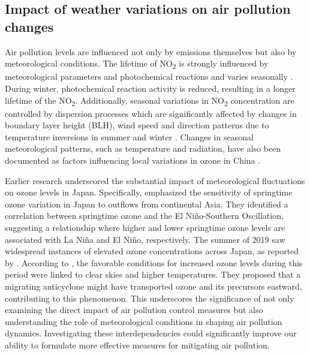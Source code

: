 \subsection{Impact of weather variations on air pollution changes}

Air pollution levels are influenced not only by emissions themselves but also by meteorological conditions. The lifetime of NO\textsubscript{2} is strongly influenced by meteorological parameters and photochemical reactions \citep{barre2021estimating} and varies seasonally \citep{dragomir2015modeling,kendrick2015diurnal}. During winter, photochemical reaction activity is reduced, resulting in a longer lifetime of the NO\textsubscript{2}. Additionally, seasonal variations in NO\textsubscript{2} concentration are controlled by dispersion processes which are significantly affected by changes in boundary layer height (BLH), wind speed and direction patterns due to temperature inversions in summer and winter \citep{barre2021estimating,kendrick2015diurnal}. Changes in seasonal meteorological patterns, such as temperature and radiation, have also been documented as factors influencing local variations in ozone in China \citep{yang2019study, yu2021review}. \par

Earlier research underscored the substantial impact of meteorological fluctuations on ozone levels in Japan. Specifically, \citep{kurokawa2009influence} emphasized the sensitivity of springtime ozone variation in Japan to outflows from continental Asia. They identified a correlation between springtime ozone and the El Niño-Southern Oscillation, suggesting a relationship where higher and lower springtime ozone levels are associated with La Niña and El Niño, respectively. The summer of 2019 saw widespread instances of elevated ozone concentrations across Japan, as reported by \citep{fukunaga2021relationship, ito202130}. According to \citep{fukunaga2021relationship}, the favorable conditions for increased ozone levels during this period were linked to clear skies and higher temperatures. They proposed that a migrating anticyclone might have transported ozone and its precursors eastward, contributing to this phenomenon. This underscores the significance of not only examining the direct impact of air pollution control measures but also understanding the role of meteorological conditions in shaping air pollution dynamics. Investigating these interdependencies could significantly improve our ability to formulate more effective measures for mitigating air pollution. \par

